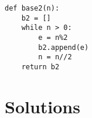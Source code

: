\medskip
\begin{lstlisting}
def base2(n):
    b2 = []
    while n > 0:
        e = n%2
        b2.append(e)
        n = n//2
    return b2
\end{lstlisting}
\section{Solutions} 
\shipoutAnswer
